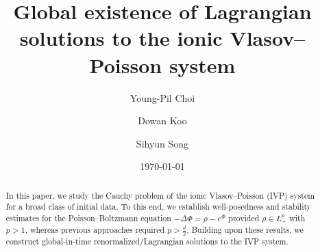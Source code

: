 \documentclass[11pt,reqno,a4paper]{amsart}
\theoremstyle{definition}
\theoremstyle{remark}
\numberwithin{equation}{section}
\begin{document}
\title[Lagrangian solutions to the ionic Vlasov--Poisson system]{Global existence of Lagrangian solutions to the ionic Vlasov--Poisson system}


\author{Young-Pil Choi}
\address{Department of Mathematics, Yonsei University, Seoul 03722, Republic of Korea}

\author{Dowan Koo}
\address{Mathematical Institute, University of Oxford, Oxford OX2 6GG, United Kingdom}

\author{Sihyun Song}
\address{Department of Mathematics, Yonsei University, Seoul 03722, Republic of Korea}


\date{\today}
 




\begin{abstract} 
In this paper, we study the Cauchy problem of the ionic Vlasov--Poisson (IVP) system for a broad class of initial data. To this end, we establish well-posedness and stability estimates for the Poisson--Boltzmann equation $-\Delta \Phi = \rho -e^\Phi$ provided $\rho \in L_+^p$ with $p>1$, whereas previous approaches required $p>\frac{d}{2}$. Building upon these results, we construct global-in-time renormalized/Lagrangian solutions to the IVP system.
\end{abstract}


\maketitle

\setcounter{tocdepth}{1}
%
%
%
%
%
\end{document}
